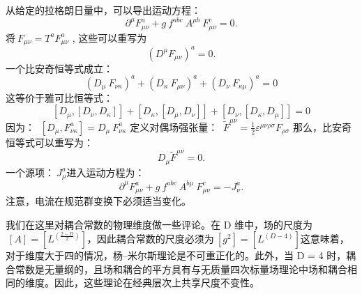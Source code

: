 从给定的拉格朗日量中，可以导出运动方程：
\[\displaystyle \ \partial ^{\mu }F_{\mu \nu }^{a}+g\ f^{abc}\ A^{\mu b}\ F_{\mu \nu }^{c}=0.~\]
将\(\displaystyle \ F_{\mu \nu }=T^{a}F_{\mu \nu }^{a}\) ,  
这些可以重写为
\[\displaystyle \ \left(D^{\mu }F_{\mu \nu }\right)^{a}=0.~\]
一个比安奇恒等式成立：
\[\displaystyle \ \left(D_{\mu }\ F_{\nu \kappa }\right)^{a}+\left(D_{\kappa }\ F_{\mu \nu }\right)^{a}+\left(D_{\nu }\ F_{\kappa \mu }\right)^{a}=0~\]
这等价于雅可比恒等式：
\[\displaystyle \ \left[D_{\mu },\left[D_{\nu },D_{\kappa }\right]\right]+\left[D_{\kappa },\left[D_{\mu },D_{\nu }\right]\right]+\left[D_{\nu },\left[D_{\kappa },D_{\mu }\right]\right]=0~\]
因为：
\(\displaystyle \ \left[D_{\mu },F_{\nu \kappa }^{a}\right]=D_{\mu }\ F_{\nu \kappa }^{a}\)
定义对偶场强张量：
\(\displaystyle \ {\tilde {F}}^{\mu \nu }={\tfrac {1}{2}}\varepsilon ^{\mu \nu \rho \sigma }F_{\rho \sigma }\)
那么，比安奇恒等式可以重写为：
\[\displaystyle \ D_{\mu }{\tilde {F}}^{\mu \nu }=0.~\]
一个源项：\(\displaystyle \ J_{\mu }^{a}\)进入运动方程为：
\[\displaystyle \ \partial ^{\mu }F_{\mu \nu }^{a}+g\ f^{abc}\ A^{b\mu }\ F_{\mu \nu }^{c}=-J_{\nu }^{a}.~\]
注意，电流在规范群变换下必须适当变化。

我们在这里对耦合常数的物理维度做一些评论。在 D 维中，场的尺度为\(\displaystyle \ \left[A\right]=\left[L^{\left({\tfrac {2-D}{2}}\right)}\right]\)，因此耦合常数的尺度必须为\(\displaystyle \ \left[g^{2}\right]=\left[L^{\left(D-4\right)}\right]\)这意味着，对于维度大于四的情况，杨–米尔斯理论是不可重正化的。此外，当 D = 4 时，耦合常数是无量纲的，且场和耦合的平方具有与无质量四次标量场理论中场和耦合相同的维度。因此，这些理论在经典层次上共享尺度不变性。